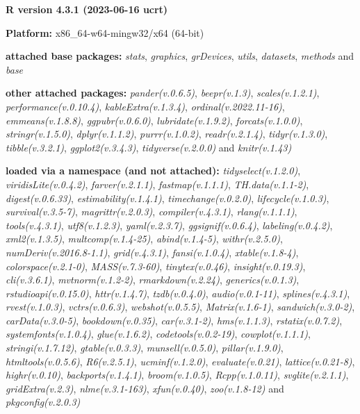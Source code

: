 \documentclass[
  bookmarksnumbered]{article}
\begin{document}
\textbf{R version 4.3.1 (2023-06-16 ucrt)}

\textbf{Platform:} x86\_64-w64-mingw32/x64 (64-bit)

\textbf{attached base packages:}
\emph{stats}, \emph{graphics}, \emph{grDevices}, \emph{utils}, \emph{datasets}, \emph{methods} and \emph{base}

\textbf{other attached packages:}
\emph{pander(v.0.6.5)}, \emph{beepr(v.1.3)}, \emph{scales(v.1.2.1)}, \emph{performance(v.0.10.4)}, \emph{kableExtra(v.1.3.4)}, \emph{ordinal(v.2022.11-16)}, \emph{emmeans(v.1.8.8)}, \emph{ggpubr(v.0.6.0)}, \emph{lubridate(v.1.9.2)}, \emph{forcats(v.1.0.0)}, \emph{stringr(v.1.5.0)}, \emph{dplyr(v.1.1.2)}, \emph{purrr(v.1.0.2)}, \emph{readr(v.2.1.4)}, \emph{tidyr(v.1.3.0)}, \emph{tibble(v.3.2.1)}, \emph{ggplot2(v.3.4.3)}, \emph{tidyverse(v.2.0.0)} and \emph{knitr(v.1.43)}

\textbf{loaded via a namespace (and not attached):}
\emph{tidyselect(v.1.2.0)}, \emph{viridisLite(v.0.4.2)}, \emph{farver(v.2.1.1)}, \emph{fastmap(v.1.1.1)}, \emph{TH.data(v.1.1-2)}, \emph{digest(v.0.6.33)}, \emph{estimability(v.1.4.1)}, \emph{timechange(v.0.2.0)}, \emph{lifecycle(v.1.0.3)}, \emph{survival(v.3.5-7)}, \emph{magrittr(v.2.0.3)}, \emph{compiler(v.4.3.1)}, \emph{rlang(v.1.1.1)}, \emph{tools(v.4.3.1)}, \emph{utf8(v.1.2.3)}, \emph{yaml(v.2.3.7)}, \emph{ggsignif(v.0.6.4)}, \emph{labeling(v.0.4.2)}, \emph{xml2(v.1.3.5)}, \emph{multcomp(v.1.4-25)}, \emph{abind(v.1.4-5)}, \emph{withr(v.2.5.0)}, \emph{numDeriv(v.2016.8-1.1)}, \emph{grid(v.4.3.1)}, \emph{fansi(v.1.0.4)}, \emph{xtable(v.1.8-4)}, \emph{colorspace(v.2.1-0)}, \emph{MASS(v.7.3-60)}, \emph{tinytex(v.0.46)}, \emph{insight(v.0.19.3)}, \emph{cli(v.3.6.1)}, \emph{mvtnorm(v.1.2-2)}, \emph{rmarkdown(v.2.24)}, \emph{generics(v.0.1.3)}, \emph{rstudioapi(v.0.15.0)}, \emph{httr(v.1.4.7)}, \emph{tzdb(v.0.4.0)}, \emph{audio(v.0.1-11)}, \emph{splines(v.4.3.1)}, \emph{rvest(v.1.0.3)}, \emph{vctrs(v.0.6.3)}, \emph{webshot(v.0.5.5)}, \emph{Matrix(v.1.6-1)}, \emph{sandwich(v.3.0-2)}, \emph{carData(v.3.0-5)}, \emph{bookdown(v.0.35)}, \emph{car(v.3.1-2)}, \emph{hms(v.1.1.3)}, \emph{rstatix(v.0.7.2)}, \emph{systemfonts(v.1.0.4)}, \emph{glue(v.1.6.2)}, \emph{codetools(v.0.2-19)}, \emph{cowplot(v.1.1.1)}, \emph{stringi(v.1.7.12)}, \emph{gtable(v.0.3.3)}, \emph{munsell(v.0.5.0)}, \emph{pillar(v.1.9.0)}, \emph{htmltools(v.0.5.6)}, \emph{R6(v.2.5.1)}, \emph{ucminf(v.1.2.0)}, \emph{evaluate(v.0.21)}, \emph{lattice(v.0.21-8)}, \emph{highr(v.0.10)}, \emph{backports(v.1.4.1)}, \emph{broom(v.1.0.5)}, \emph{Rcpp(v.1.0.11)}, \emph{svglite(v.2.1.1)}, \emph{gridExtra(v.2.3)}, \emph{nlme(v.3.1-163)}, \emph{xfun(v.0.40)}, \emph{zoo(v.1.8-12)} and \emph{pkgconfig(v.2.0.3)}

\printbibliography
\end{document}
